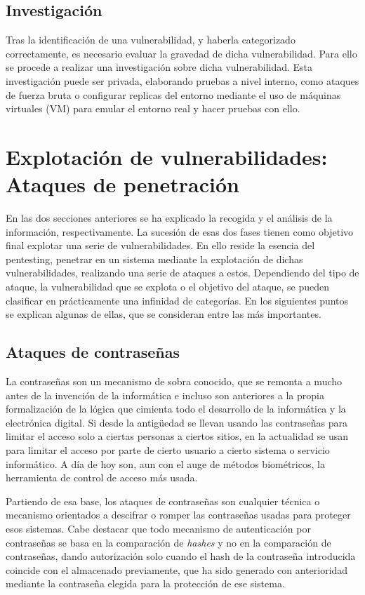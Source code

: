 \subsection{Investigación}

Tras la identificación de una vulnerabilidad, y haberla categorizado correctamente, es necesario evaluar la gravedad de dicha vulnerabilidad. Para ello se procede a realizar una investigación sobre dicha vulnerabilidad. Esta investigación puede ser privada, elaborando pruebas a nivel interno, como ataques de fuerza bruta o configurar replicas del entorno mediante el uso de máquinas virtuales (VM) para emular el entorno real y hacer pruebas con ello.

\section[Explotación de vulnerabilidades]{Explotación de vulnerabilidades: Ataques de penetración}

En las dos secciones anteriores se ha explicado la recogida y el análisis de la información, respectivamente. La sucesión de esas dos fases tienen como objetivo final explotar una serie de vulnerabilidades. En ello reside la esencia del pentesting, penetrar en un sistema mediante la explotación de dichas vulnerabilidades, realizando una serie de ataques a estos. Dependiendo del tipo de ataque, la vulnerabilidad que se explota o el objetivo del ataque, se pueden clasificar en prácticamente una infinidad de categorías. En los siguientes puntos se explican algunas de ellas, que se consideran entre las más importantes.

\subsection{Ataques de contraseñas}
La contraseñas son un mecanismo de sobra conocido, que se remonta a mucho antes de la invención de la informática e incluso son anteriores a la propia formalización de la lógica que cimienta todo el desarrollo de la informática y la electrónica digital. Si desde la antigüedad se llevan usando las contraseñas para limitar el acceso solo a ciertas personas a ciertos sitios, en la actualidad se usan para limitar el acceso por parte de cierto usuario a cierto sistema o servicio informático. A día de hoy son, aun con el auge de métodos biométricos, la herramienta de control de acceso más usada.

Partiendo de esa base, los ataques de contraseñas son cualquier técnica o mecanismo orientados a descifrar o romper las contraseñas usadas para proteger esos sistemas. Cabe destacar que todo mecanismo de autenticación por contraseñas se basa en la comparación de \emph{hashes} y no en la comparación de contraseñas, dando autorización solo cuando el hash de la contraseña introducida coincide con el almacenado previamente, que ha sido generado con anterioridad mediante la contraseña elegida para la protección de ese sistema.

